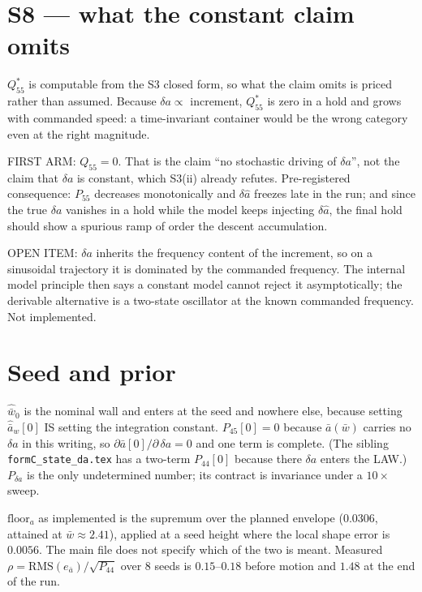 \documentclass[11pt,a4paper,fontset=none]{ctexart}
\newcommand{\ba}{\bar{a}}
\newcommand{\bw}{\bar{w}}
\begin{document}
\section*{S8 --- what the constant claim omits}

$Q_{55}^{\ast}$ is computable from the S3 closed form, so what the claim omits
is priced rather than assumed. Because $\delta a \propto$ increment,
$Q_{55}^{\ast}$ is zero in a hold and grows with commanded speed: a
time-invariant container would be the wrong category even at the right
magnitude.

FIRST ARM: $Q_{55} = 0$. That is the claim ``no stochastic driving of
$\delta a$'', not the claim that $\delta a$ is constant, which S3(ii) already
refutes. Pre-registered consequence: $P_{55}$ decreases monotonically and
$\delta\hat{a}$ freezes late in the run; and since the true $\delta a$ vanishes
in a hold while the model keeps injecting $\delta\hat{a}$, the final hold should
show a spurious ramp of order the descent accumulation.

OPEN ITEM: $\delta a$ inherits the frequency content of the increment, so on a
sinusoidal trajectory it is dominated by the commanded frequency. The internal
model principle then says a constant model cannot reject it asymptotically; the
derivable alternative is a two-state oscillator at the known commanded
frequency. Not implemented.

\section*{Seed and prior}

$\hat{\bw}_0$ is the nominal wall and enters at the seed and nowhere else,
because setting $\hat{\ba}_w[0]$ IS setting the integration constant.
$P_{45}[0] = 0$ because $\ba(\bw)$ carries no $\delta a$ in this writing, so
$\partial\ba[0]/\partial\,\delta a = 0$ and one term is complete. (The sibling
\texttt{formC\_state\_da.tex} has a two-term $P_{44}[0]$ because there
$\delta a$ enters the LAW.) $P_{\delta a}$ is the only undetermined number; its
contract is invariance under a $10\times$ sweep.

$\mathrm{floor}_a$ as implemented is the supremum over the planned envelope
($0.0306$, attained at $\bw \approx 2.41$), applied at a seed height where the
local shape error is $0.0056$. The main file does not specify which of the two
is meant. Measured $\rho = \mathrm{RMS}(e_{\ba})/\sqrt{P_{44}}$ over 8 seeds is
$0.15$--$0.18$ before motion and $1.48$ at the end of the run.
\end{document}
